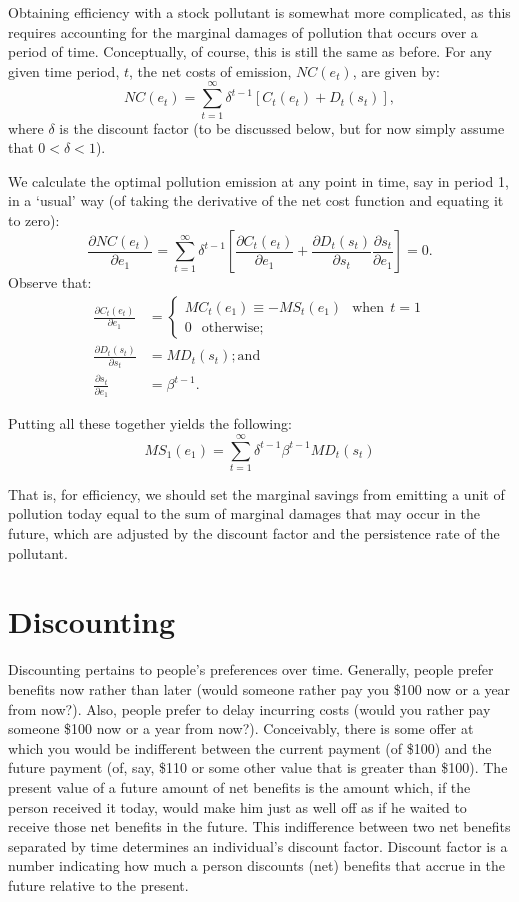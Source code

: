 \documentclass[
]{book}
\begin{document}
Obtaining efficiency with a stock pollutant is somewhat more complicated, as this requires accounting for the marginal damages of pollution that occurs over a period of time. Conceptually, of course, this is still the same as before. For any given time period, \(t\), the net costs of emission, \(NC(e_t)\), are given by:
\[NC(e_t) = \sum_{t=1}^{\infty}\delta^{t-1}\left[C_t(e_t)+D_t(s_t)\right],\]
where \(\delta\) is the discount factor (to be discussed below, but for now simply assume that \(0<\delta<1\)).

We calculate the optimal pollution emission at any point in time, say in period 1, in a `usual' way (of taking the derivative of the net cost function and equating it to zero):
\[\frac{\partial NC(e_t)}{\partial e_1} = \sum_{t=1}^{\infty}\delta^{t-1}\left[\frac{\partial C_t(e_t)}{\partial e_1}+\frac{\partial D_t(s_t)}{\partial s_t}\frac{\partial s_t}{\partial e_1}\right] = 0.\]
Observe that:
\[\begin{aligned}
\frac{\partial C_t(e_t)}{\partial e_1} &= \left\{
    \begin{array}{ll}
      MC_t(e_1) \equiv -MS_t(e_1)\;~~\text{when}~~t = 1 \\
      0\;~~\text{otherwise};
    \end{array}
  \right.\\
  \frac{\partial D_t(s_t)}{\partial s_t} &= MD_t(s_t); \text{and}\\
  \frac{\partial s_t}{\partial e_1} &= \beta^{t-1}.
\end{aligned}\]

Putting all these together yields the following: \[MS_1(e_1) = \sum_{t=1}^{\infty}\delta^{t-1}\beta^{t-1}MD_t(s_t)\]

That is, for efficiency, we should set the marginal savings from emitting a unit of pollution today equal to the sum of marginal damages that may occur in the future, which are adjusted by the discount factor and the persistence rate of the pollutant.

\hypertarget{discounting}{%
\section{Discounting}\label{discounting}}

Discounting pertains to people's preferences over time. Generally, people prefer benefits now rather than later (would someone rather pay you \$100 now or a year from now?).
Also, people prefer to delay incurring costs (would you rather pay someone \$100 now or a year from now?). Conceivably, there is some offer at which you would be indifferent between the current payment (of \$100) and the future payment (of, say, \$110 or some other value that is greater than \$100). The present value of a future amount of net benefits is the amount which, if the person received it today, would make him just as well off as if he waited to receive those net benefits in the future. This indifference between two net benefits separated by time determines an individual's discount factor. Discount factor is a number indicating how much a person discounts (net) benefits that accrue in the future relative to the present.
\end{document}
